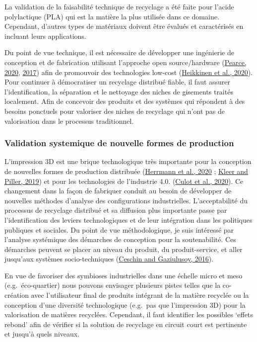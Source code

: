 \documentclass[
  11pt,
]{article}
\begin{document}
La validation de la faisabilité technique de recyclage a été faite pour
l'acide polylactique (PLA) qui est la matière la plus utilisée dans ce
domaine. Cependant, d'autres types de matériaux doivent être évalués et
caractérisés en incluant leurs applications.

Du point de vue technique, il est nécessaire de développer une
ingénierie de conception et de fabrication utilisant l'approche open
source/hardware (\protect\hyperlink{ref-Pearce2020a}{Pearce, 2020},
\protect\hyperlink{ref-Pearce2017b}{2017}) afin de promouvoir des
technologies low-cost (\protect\hyperlink{ref-Heikkinen2020a}{Heikkinen
et al., 2020}). Pour continuer à démocratiser un recyclage distribué
fiable, il faut assurer l'identification, la séparation et le nettoyage
des niches de gisements traités localement. Afin de concevoir des
produits et des systèmes qui répondent à des besoins ponctuels pour
valoriser des niches de recyclage qui n'ont pas de valorisation dans le
processus traditionnel.

\hypertarget{validation-systemique-de-nouvelle-formes-de-production}{%
\subsubsection{Validation systemique de nouvelle formes de
production}\label{validation-systemique-de-nouvelle-formes-de-production}}

L'impression 3D est une brique technologique très importante pour la
conception de nouvelles formes de production distribuée
(\protect\hyperlink{ref-Herrmann2020}{Herrmann et al., 2020} ;
\protect\hyperlink{ref-Kleer2019}{Kleer and Piller, 2019}) et pour les
technologies de l'industrie 4.0.
(\protect\hyperlink{ref-Culot2020}{Culot et al., 2020}). Ce changement
dans la façon de fabriquer conduit au besoin de développer de nouvelles
méthodes d'analyse des configurations industrielles. L'acceptabilité du
processus de recyclage distribué et sa diffusion plus importante passe
par l'identification des leviers technologiques et de leur intégration
dans les politiques publiques et sociales. Du point de vue
méthodologique, je suis intéressé par l'analyse systémique des démarches
de conception pour la soutenabilité. Ces démarches peuvent se placer au
niveau du produit, du produit-service, et aller jusqu'aux systèmes
socio-techniques (\protect\hyperlink{ref-Ceschin2016}{Ceschin and
Gaziulusoy, 2016}).

En vue de favoriser des symbioses industrielles dans une échelle micro
et meso (e.g.~éco-quartier) nous pouvons envisager plusieurs pistes
telles que la co-création avec l'utilisateur final de produits intégrant
de la matière recyclée ou la conception d'une diversité technologique
(e.g.~pas que l'impression 3D) pour la valorisation de matières
recyclées. Cependant, il faut identifier les possibles `effets rebond'
afin de vérifier si la solution de recyclage en circuit court est
pertinente et jusqu'à quels niveaux.
\end{document}
